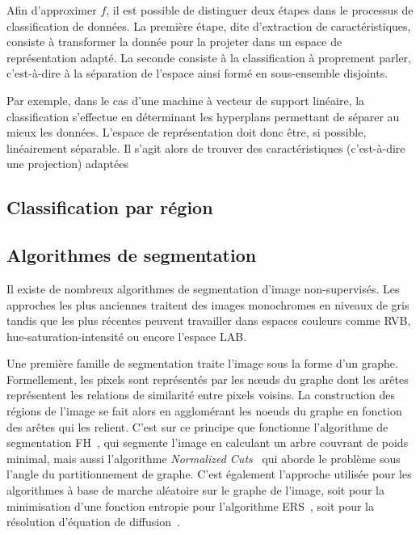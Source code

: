 Afin d'approximer $f$, il est possible de distinguer deux étapes dans le processus de classification de données. La première étape, dite d'extraction de caractéristiques, consiste à transformer la donnée pour la projeter dans un espace de représentation adapté. La seconde consiste à la classification à proprement parler, c'est-à-dire à la séparation de l'espace ainsi formé en sous-ensemble disjoints.

Par exemple, dans le cas d'une machine à vecteur de support linéaire, la classification s'effectue en déterminant les hyperplans permettant de séparer au mieux les données. L'espace de représentation doit donc être, si possible, linéairement séparable. Il s'agit alors de trouver des caractéristiques (c'est-à-dire une projection) adaptées

\subsection{Classification par région}

\subsection{Algorithmes de segmentation}

Il existe de nombreux algorithmes de segmentation d'image non-supervisés. Les approches les plus anciennes traitent des images monochromes en niveaux de gris tandis que les plus récentes peuvent travailler dans espaces couleurs comme \gls{RVB}, hue-saturation-intensité ou encore l'espace \gls{LAB}.

Une première famille de segmentation traite l'image sous la forme d'un graphe. Formellement, les pixels sont représentés par les n\oe{}uds du graphe dont les arêtes représentent les relations de similarité entre pixels voisins. La construction des régions de l'image se fait alors en agglomérant les noeuds du graphe en fonction des arêtes qui les relient. C'est sur ce principe que fonctionne l'algorithme de segmentation \gls{FH}~\cite{felzenszwalb_efficient_2004}, qui segmente l'image en calculant un arbre couvrant de poids minimal, mais aussi l'algorithme \emph{Normalized Cuts}~\cite{shi_normalized_2000} qui aborde le problème sous l'angle du partitionnement de graphe. C'est également l'approche utilisée pour les algorithmes à base de marche aléatoire sur le graphe de l'image, soit pour la minimisation d'une fonction entropie pour l'algorithme \gls{ERS}~\cite{liu_entropy_2011}, soit pour la résolution d'équation de diffusion~\cite{grady_random_2006}.

